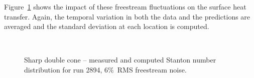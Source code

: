Figure~\ref{fig:double_cone_AEDC_2894_unsteady_6percent_St} shows the impact of these freestream fluctuations on the surface heat transfer.  Again, the temporal variation in both the data and the predictions are averaged and the standard deviation at each location is computed.
\begin{figure}[hbtp]
  \begin{center}
     \\
    \caption{Sharp double cone -- measured and computed Stanton number distribution for run 2894, 6\%~RMS freestream noise.\label{fig:double_cone_AEDC_2894_unsteady_6percent_St}}
  \end{center}
\end{figure}


